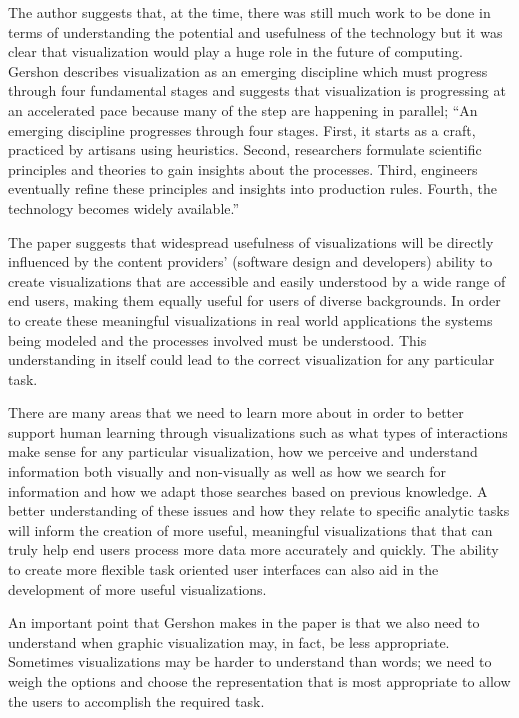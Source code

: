 \documentclass{sig-alternate}
\begin{document}
The author suggests that, at the time, there was still much work to be done in
terms of understanding the potential and usefulness of the technology but it was
clear that visualization would play a huge role in the future of computing.
Gershon describes visualization as an emerging discipline which must progress
through four fundamental stages and suggests that visualization is progressing
at an accelerated pace because many of the step are happening in parallel; ``An
emerging discipline progresses through four stages. First, it starts as a craft,
practiced by artisans using heuristics. Second, researchers formulate scientific
principles and theories to gain insights about the processes. Third, engineers
eventually refine these principles and insights into production rules. Fourth,
the technology becomes widely available.''

The paper suggests that widespread usefulness of visualizations will be directly
influenced by the content providers' (software design and developers) ability to
create visualizations that are accessible and easily understood by a wide range
of end users, making them equally useful for users of diverse backgrounds. In
order to create these meaningful visualizations in real world applications the
systems being modeled and the processes involved must be understood. This
understanding in itself could lead to the correct visualization for any
particular task.

There are many areas that we need to learn more about in order to better support
human learning through visualizations such as what types of interactions make
sense for any particular visualization, how we perceive and understand
information both visually and non-visually as well as how we search for
information and how we adapt those searches based on previous knowledge. A
better understanding of these issues and how they relate to specific analytic
tasks will inform the creation of more useful, meaningful visualizations that
that can truly help end users process more data more accurately and quickly. The
ability to create more flexible task oriented user interfaces can also aid in
the development of more useful visualizations.

An important point that Gershon makes in the paper is that we also need to
understand when graphic visualization may, in fact, be less appropriate.
Sometimes visualizations may be harder to understand than words; we need to
weigh the options and choose the representation that is most appropriate to
allow the users to accomplish the required task.
\end{document}
